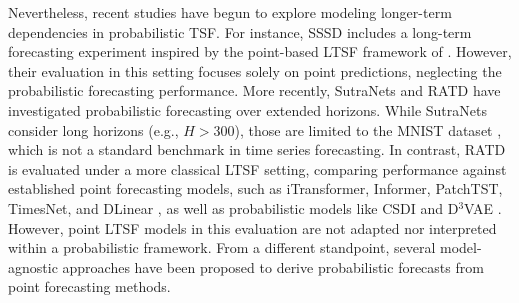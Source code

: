 \documentclass[a4paper,oneside,bibliography=totoc]{scrbook}
\begin{document}
Nevertheless, recent studies have begun to explore modeling longer-term dependencies in probabilistic TSF. 
For instance, SSSD \cite{alcaraz_diffusion-based_2022} includes a long-term forecasting experiment inspired by the point-based LTSF framework of \citet{zhou_informer_2021}. However, their evaluation in this setting focuses solely on point predictions, neglecting the probabilistic forecasting performance. 
More recently, SutraNets \cite{bergsma_sutranets_2023} and RATD \cite{liu_retrieval-augmented_2024} have investigated probabilistic forecasting over extended horizons. 
While SutraNets consider long horizons (e.g., $H > 300$), those are limited to the MNIST dataset \cite{lecun_mnist_1998}, which is not a standard benchmark in time series forecasting. In contrast, RATD \cite{liu_retrieval-augmented_2024} is evaluated under a more classical LTSF setting, comparing performance against established point forecasting models, such as iTransformer, Informer, PatchTST, TimesNet, and DLinear \cite{liu_itransformer_2023, zhou_informer_2021, nie_time_2022, wu_timesnet_2022, zeng_are_2023}, as well as probabilistic models like CSDI and D$^3$VAE \cite{tashiro_csdi_2021, li_generative_2022}. However, point LTSF models in this evaluation are not adapted nor interpreted within a probabilistic framework.
From a different standpoint, several model-agnostic approaches have been proposed to derive probabilistic forecasts from point forecasting methods. 
\end{document}
